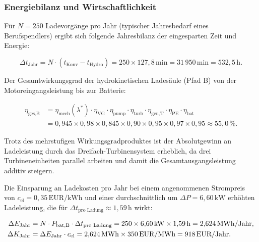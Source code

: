 ﻿\documentclass[a4paper,12pt]{article}
\begin{document}
\subsubsection{Energiebilanz und Wirtschaftlichkeit}

Für $N = 250$ Ladevorgänge pro Jahr (typischer Jahresbedarf eines
Berufspendlers) ergibt sich folgende Jahresbilanz der eingesparten Zeit
und Energie:

\begin{equation}
  \Delta t_\text{Jahr}
    = N \cdot (t_\text{Konv} - t_\text{Hydro})
    = 250 \times 127{,}8\,\text{min}
    = 31\,950\,\text{min}
    = 532{,}5\,\text{h}.
  \label{eq:dt_jahr}
\end{equation}

Der Gesamtwirkungsgrad der hydrokinetischen Ladesäule (Pfad B) von
der Motoreingangsleistung bis zur Batterie:

\begin{align}
  \eta_\text{ges,B}
    & = \eta_\text{mech}(\lambda^*) \cdot \eta_\text{VG} \cdot \eta_\text{pump}
      \cdot \eta_\text{turb} \cdot \eta_\text{gen,T} \cdot \eta_\text{PE}
      \cdot \eta_\text{bat} \\
    & = 0{,}945 \times 0{,}98 \times 0{,}845 \times 0{,}90
      \times 0{,}95 \times 0{,}97 \times 0{,}95
    \approx 55{,}0\,\%.
  \label{eq:eta_ges_B}
\end{align}

Trotz des mehrstufigen Wirkungsgradproduktes ist der Absolutgewinn an
Ladeleistung durch das Dreifach-Turbinensystem erheblich, da drei
Turbineneinheiten parallel arbeiten und damit die Gesamtausgangsleistung
additiv steigern.

Die Einsparung an Ladekosten pro Jahr bei einem angenommenen Strompreis
von $c_\text{el} = 0{,}35\,\text{EUR/kWh}$ und einer durchschnittlich
um $\Delta P = 6{,}60\,\text{kW}$ erhöhten Ladeleistung, die für
$\Delta t_\text{pro Ladung} \approx 1{,}59\,\text{h}$ wirkt:

\begin{align}
  \Delta E_\text{Jahr}
    &= N \cdot P_\text{bat,B} \cdot \Delta t_\text{pro Ladung}
     = 250 \times 6{,}60\,\text{kW} \times 1{,}59\,\text{h}
     = 2{,}624\,\text{MWh/Jahr}, \notag \\
  \Delta K_\text{Jahr}
    &= \Delta E_\text{Jahr} \cdot c_\text{el}
     = 2{,}624\,\text{MWh} \times 350\,\text{EUR/MWh}
     = 918\,\text{EUR/Jahr}.
  \label{eq:K_Jahr}
\end{align}
\end{document}
